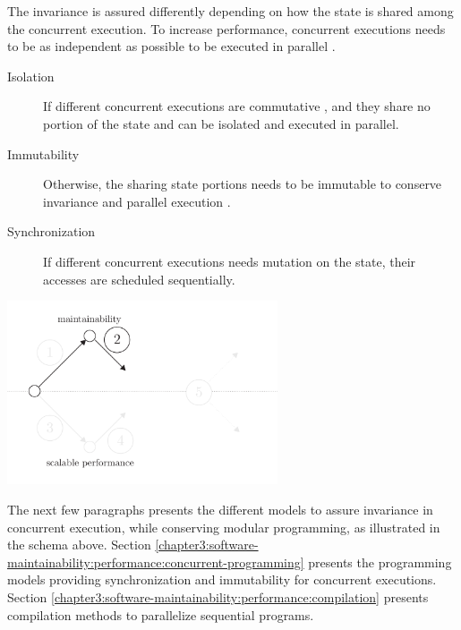 The invariance is assured differently depending on how the state is shared among the concurrent execution.
To increase performance, concurrent executions needs to be as independent as possible to be executed in parallel .
\begin{description}
  \item[Isolation] If different concurrent executions are commutative \cite{Rinard1996,Clements2013a}, and they share no portion of the state and can be isolated and executed in parallel.
  \item[Immutability] Otherwise, the sharing state portions needs to be immutable to conserve invariance and parallel execution \cite{Gordon2012,Matsakis2012a}.
  \item[Synchronization] If different concurrent executions needs mutation on the state, their accesses are scheduled sequentially.
\end{description}

\begin{center}
\includegraphics[width=0.6\textwidth]{../ressources/state-of-the-art-2.pdf}
\end{center}

The next few paragraphs presents the different models to assure invariance in concurrent execution, while conserving modular programming, as illustrated in the schema above.
Section \ref{chapter3:software-maintainability:performance:concurrent-programming} presents the programming models providing synchronization and immutability for concurrent executions.
Section \ref{chapter3:software-maintainability:performance:compilation} presents compilation methods to parallelize sequential programs.


